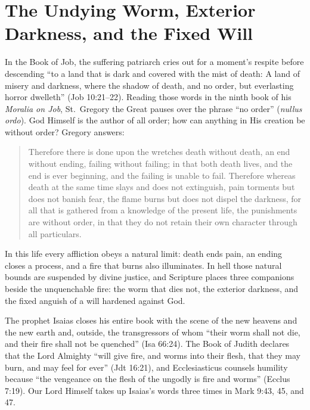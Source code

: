 \section{The Undying Worm, Exterior Darkness, and the Fixed Will}

In the Book of Job, the suffering patriarch cries out for a moment's respite before descending ``to a land that is dark and covered with the mist of death: A land of misery and darkness, where the shadow of death, and no order, but everlasting horror dwelleth'' (Job 10:21--22). Reading those words in the ninth book of his \textit{Moralia on Job}, St.\ Gregory the Great pauses over the phrase ``no order'' (\textit{nullus ordo}). God Himself is the author of all order; how can anything in His creation be without order? Gregory answers:

\begin{quote}
Therefore there is done upon the wretches death without death, an end without ending, failing without failing; in that both death lives, and the end is ever beginning, and the failing is unable to fail. Therefore whereas death at the same time slays and does not extinguish, pain torments but does not banish fear, the flame burns but does not dispel the darkness, for all that is gathered from a knowledge of the present life, the punishments are without order, in that they do not retain their own character through all particulars.
\end{quote}

In this life every affliction obeys a natural limit: death ends pain, an ending closes a process, and a fire that burns also illuminates. In hell those natural bounds are suspended by divine justice, and Scripture places three companions beside the unquenchable fire: the worm that dies not, the exterior darkness, and the fixed anguish of a will hardened against God.

The prophet Isaias closes his entire book with the scene of the new heavens and the new earth and, outside, the transgressors of whom ``their worm shall not die, and their fire shall not be quenched'' (Isa 66:24). The Book of Judith declares that the Lord Almighty ``will give fire, and worms into their flesh, that they may burn, and may feel for ever'' (Jdt 16:21), and Ecclesiasticus counsels humility because ``the vengeance on the flesh of the ungodly is fire and worms'' (Ecclus 7:19). Our Lord Himself takes up Isaias's words three times in Mark 9:43, 45, and 47.

